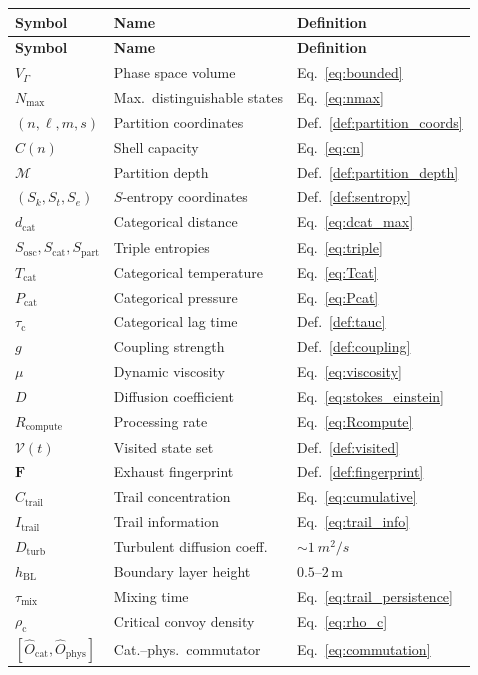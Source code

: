 \documentclass[11pt,twocolumn,a4paper]{article}
\theoremstyle{plain}
\theoremstyle{definition}
\theoremstyle{remark}
\newcommand{\Sk}{S_k}
\newcommand{\St}{S_t}
\newcommand{\Se}{S_e}
\newcommand{\Sosc}{S_{\mathrm{osc}}}
\newcommand{\Scat}{S_{\mathrm{cat}}}
\newcommand{\Spart}{S_{\mathrm{part}}}
\newcommand{\Ocat}{\hat{O}_{\mathrm{cat}}}
\newcommand{\Ophys}{\hat{O}_{\mathrm{phys}}}
\newcommand{\dcat}{d_{\mathrm{cat}}}
\newcommand{\Rcompute}{R_{\mathrm{compute}}}
\newcommand{\VGamma}{V_{\Gamma}}
\newcommand{\Nmax}{N_{\mathrm{max}}}
\newcommand{\Tcat}{T_{\mathrm{cat}}}
\newcommand{\Pcat}{P_{\mathrm{cat}}}
\newcommand{\Depth}{\mathcal{M}}
\newcommand{\tauc}{\tau_{\mathrm{c}}}
\newcommand{\taumix}{\tau_{\mathrm{mix}}}
\newcommand{\Dturb}{D_{\mathrm{turb}}}
\newcommand{\hBL}{h_{\mathrm{BL}}}
\newcommand{\Itrail}{I_{\mathrm{trail}}}
\newcommand{\Ctrail}{C_{\mathrm{trail}}}
\newcommand{\rhoc}{\rho_{\mathrm{c}}}
\begin{document}
\begin{longtable}{lll}
\toprule
\textbf{Symbol} & \textbf{Name} & \textbf{Definition} \\
\midrule
\endfirsthead
\toprule
\textbf{Symbol} & \textbf{Name} & \textbf{Definition} \\
\midrule
\endhead
$\VGamma$ & Phase space volume & Eq.~\eqref{eq:bounded} \\
$\Nmax$ & Max.\ distinguishable states & Eq.~\eqref{eq:nmax} \\
$(n, \ell, m, s)$ & Partition coordinates & Def.~\ref{def:partition_coords} \\
$C(n)$ & Shell capacity & Eq.~\eqref{eq:cn} \\
$\Depth$ & Partition depth & Def.~\ref{def:partition_depth} \\
$(\Sk, \St, \Se)$ & $S$-entropy coordinates & Def.~\ref{def:sentropy} \\
$\dcat$ & Categorical distance & Eq.~\eqref{eq:dcat_max} \\
$\Sosc, \Scat, \Spart$ & Triple entropies & Eq.~\eqref{eq:triple} \\
$\Tcat$ & Categorical temperature & Eq.~\eqref{eq:Tcat} \\
$\Pcat$ & Categorical pressure & Eq.~\eqref{eq:Pcat} \\
$\tauc$ & Categorical lag time & Def.~\ref{def:tauc} \\
$g$ & Coupling strength & Def.~\ref{def:coupling} \\
$\mu$ & Dynamic viscosity & Eq.~\eqref{eq:viscosity} \\
$D$ & Diffusion coefficient & Eq.~\eqref{eq:stokes_einstein} \\
$\Rcompute$ & Processing rate & Eq.~\eqref{eq:Rcompute} \\
$\mathcal{V}(t)$ & Visited state set & Def.~\ref{def:visited} \\
$\mathbf{F}$ & Exhaust fingerprint & Def.~\ref{def:fingerprint} \\
$\Ctrail$ & Trail concentration & Eq.~\eqref{eq:cumulative} \\
$\Itrail$ & Trail information & Eq.~\eqref{eq:trail_info} \\
$\Dturb$ & Turbulent diffusion coeff. & $\sim \SI{1}{m^2/s}$ \\
$\hBL$ & Boundary layer height & $0.5$--$2$\,m \\
$\taumix$ & Mixing time & Eq.~\eqref{eq:trail_persistence} \\
$\rhoc$ & Critical convoy density & Eq.~\eqref{eq:rho_c} \\
$[\Ocat, \Ophys]$ & Cat.--phys.\ commutator & Eq.~\eqref{eq:commutation} \\
\bottomrule
\end{longtable}
\end{document}
